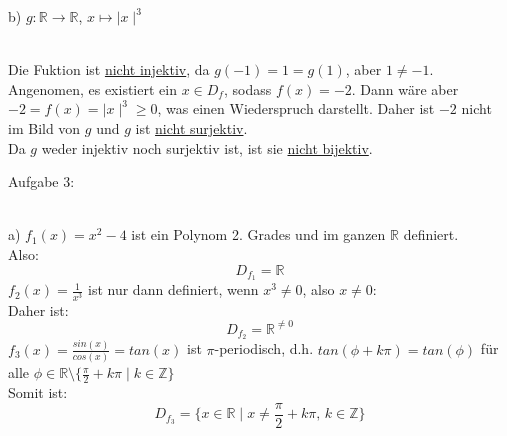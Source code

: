 \documentclass[11pt]{article}
\begin{document}
			\indent b) $g: \mathbb{R} \rightarrow \mathbb{R}$, $x \mapsto \mid x \mid ^3$\\
				\\
				Die Fuktion ist \underline{nicht injektiv}, da $g(-1)=1=g(1)$, aber $1 \neq -1$.\\
				Angenomen, es existiert ein $x \in D_f$, sodass $f(x)=-2$. Dann wäre aber $-2=f(x)= \mid x \mid ^3 \geq 0$, was einen Wiederspruch darstellt. Daher ist $-2$ nicht im Bild von $g$ und $g$ ist \underline{nicht surjektiv}.\\
				Da $g$ weder injektiv noch surjektiv ist, ist sie \underline{nicht bijektiv}.\\
		\noindent \begin{Large}Aufgabe 3:\end{Large}\\[2pt]
			\indent a) 
				$f_1(x)=x^2-4$ ist ein Polynom 2. Grades und im ganzen $\mathbb{R}$ definiert.\\ Also:
				$$D_{f_1} = \mathbb{R}$$
				$f_2(x)=\frac{1}{x^3}$ ist nur dann definiert, wenn $x^3 \neq 0$, also $x \neq 0$:\\Daher ist:
				$$D_{f_2} = \mathbb{R}^{\neq 0}$$
				$f_3(x) = \frac{sin(x)}{cos(x)} = tan(x)$ ist $\pi$-periodisch, d.h. $tan(\phi + k\pi)=tan(\phi)$ für alle $\phi \in \mathbb{R} \setminus \{\frac{\pi}{2}+k\pi \mid k \in \mathbb{Z}\}$\\
				Somit ist:
				$$D_{f_3} = \{x \in \mathbb{R} \mid x \neq \frac{\pi}{2}+k \pi \mbox{, } k \in \mathbb{Z}\}$$
				\\
\end{document}
